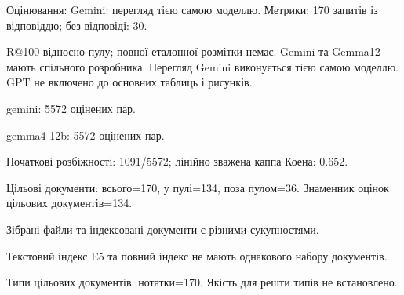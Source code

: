 \begingroup\raggedright
Оцінювання: Gemini: перегляд тією самою моделлю. Метрики: 170 запитів із відповіддю; без відповіді: 30.
\par
R@100 відносно пулу; повної еталонної розмітки немає. Gemini та Gemma12 мають спільного розробника. Перегляд Gemini виконується тією самою моделлю. GPT не включено до основних таблиць і рисунків.
\par
gemini: 5572 оцінених пар.
\par
gemma4-12b: 5572 оцінених пар.
\par
Початкові розбіжності: 1091/5572; лінійно зважена каппа Коена: 0.652.
\par
Цільові документи: всього=170, у пулі=134, поза пулом=36. Знаменник оцінок цільових документів=134.
\par
Зібрані файли та індексовані документи є різними сукупностями.
\par
Текстовий індекс E5 та повний індекс не мають однакового набору документів.
\par
Типи цільових документів: нотатки=170. Якість для решти типів не встановлено.
\par\endgroup
